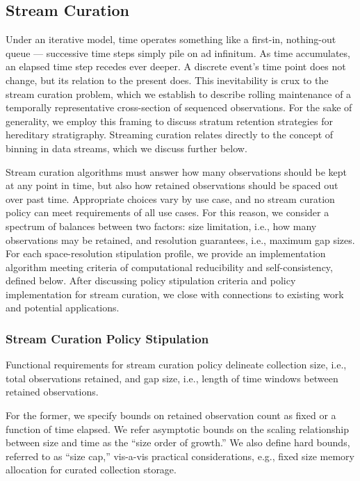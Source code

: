 \subsection{Stream Curation}

Under an iterative model, time operates something like a first-in, nothing-out queue --- successive time steps simply pile on ad infinitum.
As time accumulates, an elapsed time step recedes ever deeper.
A discrete event's time point does not change, but its relation to the present does.  %
This inevitability is crux to the stream curation problem, which we establish to describe rolling maintenance of a temporally representative cross-section of sequenced observations.
For the sake of generality, we employ this framing to discuss stratum retention strategies for hereditary stratigraphy.
Streaming curation relates directly to the concept of binning in data streams, which we discuss further below.

Stream curation algorithms must answer how many observations should be kept at any point in time, but also how retained observations should be spaced out over past time.
Appropriate choices vary by use case, and no stream curation policy can meet requirements of all use cases.
For this reason, we consider a spectrum of balances between two factors: size limitation, i.e., how many observations may be retained, and resolution guarantees, i.e., maximum gap sizes.
For each space-resolution stipulation profile, we provide an implementation algorithm meeting criteria of computational reducibility and self-consistency, defined below.
After discussing policy stipulation criteria and policy implementation for stream curation, we close with connections to existing work and potential applications.

\subsubsection{Stream Curation Policy Stipulation}

Functional requirements for stream curation policy delineate collection size, i.e., total observations retained, and gap size, i.e., length of time windows between retained observations.

For the former, we specify bounds on retained observation count as fixed or a function of time elapsed.
We refer asymptotic bounds on the scaling relationship between size and time as  the ``size order of growth.''
We also define hard bounds, referred to as ``size cap,'' vis-a-vis practical considerations, e.g., fixed size memory allocation for curated collection storage.

